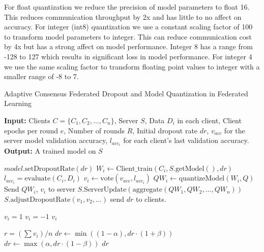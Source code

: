 \documentclass{article}
\begin{document}
For float quantization we reduce the precision of model parameters to float 16. This reduces communication throughput by 2x and has little to no affect on accuracy. For integer (int8) quantization we use a constant scaling factor of 100 to transform model parameters to integer. This can reduce communication cost by 4x but has a strong affect on model performance. Integer 8 has a range from -128 to 127 which results in significant loss in model performance. For integer 4 we use the same scaling factor to transform floating point values to integer with a smaller range of -8 to 7.


\begin{algorithm}[h]
\caption{Adaptive Consensus Federated Dropout and Model Quantization in Federated Learning}
\label{algo:fed}
\begin{algorithmic}[1]
\State \textbf{Input:} Clients $C = \{C_1, C_2, \ldots, C_n\}$, Server $S$, Data $D_{i}$ in each client, Client epochs per round $e$, Number of rounds $R$, Initial dropout rate $dr$, $v_{acc}$ for the server model validation accuracy, $l_{acc_i}$ for each client's last validation accuracy.
\State \textbf{Output:} A trained model on $S$

    \State $model.\text{setDropoutRate}(dr)$
            \State $W_i \gets \text{Client\_train}(C_i, S.\text{getModel}(), dr)$
            \State $l_{acc_i} = \text{evaluate}(C_i, D_i)$
            \State $v_i \gets \text{vote}(v_{acc}, l_{acc_i})$
            \State $QW_i \gets \text{quantizeModel}(W_i, Q)$
            \State Send $QW_i$, $v_i$ to server
        \EndFor
        \State $S.\text{ServerUpdate}(\text{aggregate}(QW_1, QW_2, \ldots, QW_n))$
        \State $S.\text{adjustDropoutRate}(v_1, v_2, \ldots)$
        \State send $dr$ to clients.
    \EndFor
\EndProcedure

        \State $v_i = 1$
    \Else
        \State $v_i = -1$
    \EndIf
    \State \Return $v_i$
\EndProcedure

    \State $r = (\sum v_i) / n$
        \State $dr \gets \min((1 - \alpha), dr \cdot (1+\beta))$
    \Else
        \State $dr \gets \max(\alpha, dr \cdot (1-\beta))$
    \EndIf
    \State \Return $dr$
\EndFunction
\end{algorithmic}
\end{algorithm}
\end{document}
